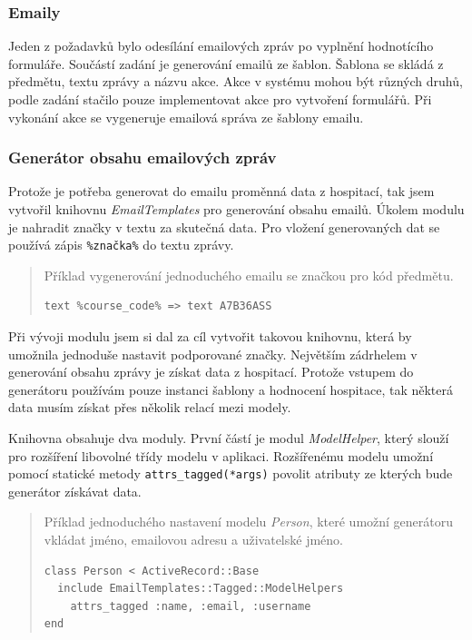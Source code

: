 \subsubsection{Emaily}
Jeden z požadavků bylo odesílání emailových zpráv po vyplnění hodnotícího formuláře. Součástí zadání je generování emailů ze šablon. Šablona se skládá z předmětu, textu zprávy a názvu akce. Akce v systému mohou být různých druhů, podle zadání stačilo pouze implementovat akce pro vytvoření formulářů. Při vykonání akce se vygeneruje emailová správa ze šablony emailu.

\subsubsection{Generátor obsahu emailových zpráv}
Protože je potřeba generovat do emailu proměnná data z hospitací, tak jsem vytvořil knihovnu \textit{EmailTemplates} pro generování obsahu emailů. Úkolem modulu je nahradit značky v textu za skutečná data. Pro vložení generovaných dat se používá zápis \verb|%značka%| do textu zprávy. 
\begin{quote}
Příklad vygenerování jednoduchého emailu se značkou pro kód předmětu.
\begin{verbatim}
text %course_code% => text A7B36ASS
\end{verbatim} 
\end{quote}

Při vývoji modulu jsem si dal za cíl vytvořit takovou knihovnu, která by umožnila jednoduše nastavit podporované značky. Největším zádrhelem v generování obsahu zprávy je získat data z hospitací. Protože vstupem do generátoru používám pouze instanci šablony a hodnocení hospitace, tak některá data musím získat přes několik relací mezi modely.

Knihovna obsahuje dva moduly. První částí je modul \textit{ModelHelper}, který slouží pro rozšíření libovolné třídy modelu v aplikaci. Rozšířenému modelu umožní pomocí statické metody \verb|attrs_tagged(*args)| povolit atributy ze kterých bude generátor získávat data. 

\begin{quote}
Příklad jednoduchého nastavení modelu \textit{Person}, které umožní generátoru vkládat jméno, emailovou adresu a uživatelské jméno.
\begin{verbatim}
class Person < ActiveRecord::Base
  include EmailTemplates::Tagged::ModelHelpers
    attrs_tagged :name, :email, :username
end
\end{verbatim} 
\end{quote}

